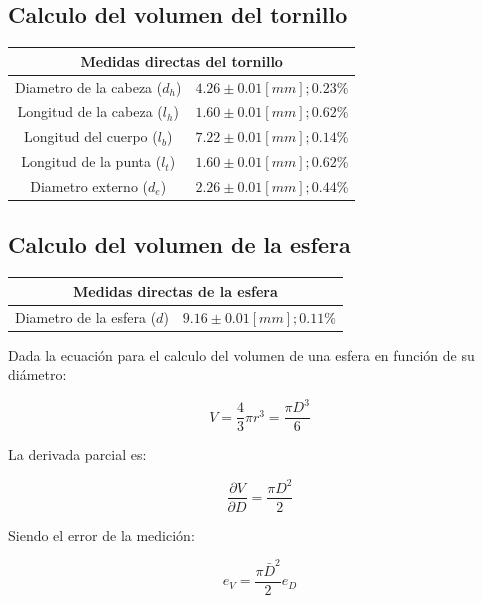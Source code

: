\documentclass[letter,11pt]{article}
\begin{document}
\subsection{Calculo del volumen del tornillo}
\begin{center}
\begin{tabular}{|c|>{\centering}m{5.0cm}<{\centering}|}
\hline
\multicolumn{2}{|c|}{\textbf{Medidas directas del tornillo}}
\tabularnewline \hline
Diametro de la cabeza ($d_h$) & $4.26 \pm 0.01 [mm]; 0.23\%$
\tabularnewline \hline
Longitud de la cabeza ($l_h$) & $1.60 \pm 0.01 [mm]; 0.62\%$
\tabularnewline \hline
  Longitud del cuerpo ($l_b$) & $7.22 \pm 0.01 [mm]; 0.14\%$
\tabularnewline \hline
 Longitud de la punta ($l_t$) & $1.60 \pm 0.01 [mm]; 0.62\%$
\tabularnewline \hline
     Diametro externo ($d_e$) & $2.26 \pm 0.01 [mm]; 0.44\%$
\tabularnewline \hline
\end{tabular}
\end{center}

\subsection{Calculo del volumen de la esfera}
\begin{center}
\begin{tabular}{|c|>{\centering}m{5.0cm}<{\centering}|}
\hline
\multicolumn{2}{|c|}{\textbf{Medidas directas de la esfera}}
\tabularnewline \hline
Diametro de la esfera ($d$) & $9.16 \pm 0.01 [mm]; 0.11\%$
\tabularnewline \hline
\end{tabular}
\end{center}

Dada la ecuación para el calculo del volumen de una esfera en función de su
diámetro:

\begin{equation}
    V = \frac{4}{3} \pi r^3 = \frac{\pi D^3}{6}
\end{equation}

La derivada parcial es:

\begin{equation}
    \frac{\partial{V}}{\partial{D}} = \frac{\pi D^2}{2}
\end{equation}

Siendo el error de la medición:

\begin{equation}
    e_V = \frac{\pi \bar{D}^2}{2} e_D
\end{equation}
\end{document}
